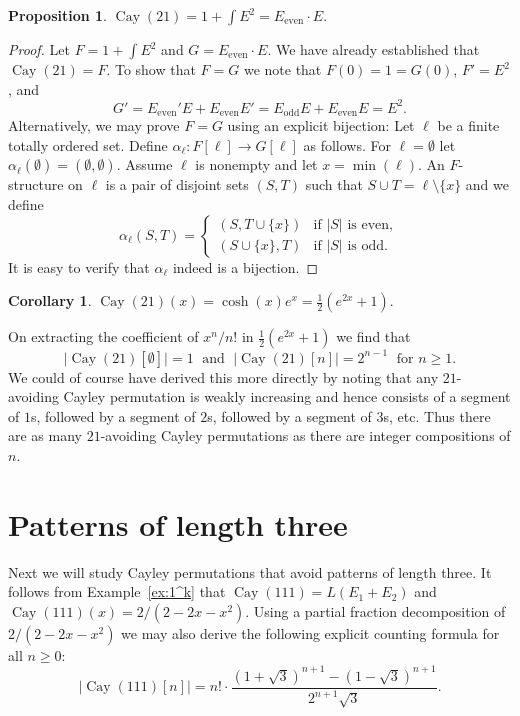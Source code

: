 \documentclass[a4paper, 11pt]{article}
\DeclareMathOperator{\Cay}{Cay}
\newcommand{\Even}[1]{#1_{\mathrm{even}}}
\newcommand{\Odd}[1]{#1_{\mathrm{odd}}}
\theoremstyle{definition}
\newtheorem{corollary}[theorem]{Corollary}
\newtheorem{proposition}[theorem]{Proposition}
\begin{document}
\begin{proposition}\label{prop: Cay(21) species}
  $\displaystyle\Cay(21) = 1 + \int\! E^2 = \Even{E} \cdot E$.
\end{proposition}
\begin{proof}
  Let $F = 1 + \int\! E^2$ and $G=\Even{E} \cdot E$. We have
  already established that $\Cay(21)=F$. To show that
  $F=G$ we note that $F(0)=1=G(0)$, $F'=E^2$, and
  \[
    G'
    = \Even{E}' E + \Even{E} E'
    = \Odd{E} E + \Even{E} E = E^2.
  \]
  Alternatively, we may prove $F=G$ using an explicit bijection:
  Let $\ell$ be a finite totally ordered set. Define
  $\alpha_{\ell}: F[\ell]\to G[\ell]$ as follows. For $\ell=\emptyset$ let
  $\alpha_{\ell}(\emptyset) = (\emptyset,\emptyset)$. Assume $\ell$ is
  nonempty and let $x = \min(\ell)$. An $F$-structure on $\ell$ is
  a pair of disjoint sets $(S,T)$ such that
  $S \cup T = \ell \setminus \{x\}$ and we define
  \[
    \alpha_{\ell}(S,T) =
    \begin{cases}
      (S, T\cup \{x\}) & \text{if $|S|$ is even}, \\
      (S\cup \{x\}, T) & \text{if $|S|$ is odd}.
    \end{cases}
  \]
  It is easy to verify that $\alpha_{\ell}$ indeed is a bijection.
\end{proof}

\begin{corollary}\label{cor:egf of cay(12)}
  $\Cay(21)(x) = \cosh(x)e^x = \frac{1}{2}(e^{2x} + 1)$.
\end{corollary}

On extracting the coefficient of $x^n/n!$ in $\frac{1}{2}(e^{2x}+1)$ we
find that
\[
  \bigl|\Cay(21)[\emptyset]\bigr|=1\;\text{ and }\;
  \bigl|\Cay(21)[n]\bigr|=2^{n-1}\;\text{ for $n \geq 1$.}
\]
We could of course have derived this more directly by noting that any
$21$-avoiding Cayley permutation is weakly increasing and hence
consists of a segment of $1$s, followed by a segment of $2$s, followed
by a segment of $3$s, etc. Thus there are as many $21$-avoiding Cayley
permutations as there are integer compositions of $n$.

\section{Patterns of length three}\label{sec: length three}

Next we will study Cayley permutations that avoid patterns
of length three.
It follows from Example~\ref{ex:1^k} that
$\Cay(111) = L(E_1 + E_2)$ and
$\Cay(111)(x)= 2/(2-2x-x^2)$.
Using a partial fraction decomposition of $2/(2-2x-x^2)$ we may also
derive the following explicit counting formula for all $n\geq 0$:
  \[
    |\Cay(111)[n]|
    = n!\cdot\frac{(1+\sqrt{3})^{n+1} - (1-\sqrt{3})^{n+1}}{2^{n+1}\sqrt{3}}.
  \]
\end{document}
